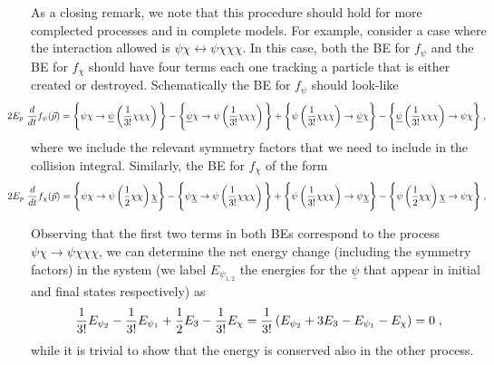 \documentclass[11pt,a4paper]{article}
\begin{document}
As a closing remark, we note that this procedure should hold for more complected processes and in complete models. For example, consider a case where the interaction allowed is $ \psi \chi \leftrightarrow \psi  \chi \chi \chi$. In this case, both the BE for $f_\psi$ and the BE for $f_\chi$ should have four terms each one tracking a   particle that is either created or destroyed. Schematically the BE for $f_\psi$ should look-like
%
$$\hspace{-0.9cm}
2E_p \ \dfrac{d}{dt} f_{\psi }(\vec{p}) = 
\lrBiggcb{\psi \chi \to \underline{\psi}  \lrb{\dfrac{1}{3!}\chi \chi \chi}} 
-\lrBiggcb{\underline{\psi} \chi \to \psi  \lrb{\dfrac{1}{3!}\chi \chi \chi}} 
+\lrBiggcb{ \psi \lrb{\dfrac{1}{3!}\chi \chi \chi} \to \underline{\psi}  \chi}
-\lrBiggcb{ \underline{\psi}  \lrb{\dfrac{1}{3!}\chi \chi \chi} \to \psi \chi} \;,
$$  
%
where we include the relevant symmetry factors that we need to include in the collision integral.
Similarly, the BE for $f_\chi$ of the form
%
$$\hspace{-0.9cm}
2E_p \ \dfrac{d}{dt} f_{\chi }(\vec{p}) = 
\lrBiggcb{\psi \chi \to \psi  \lrb{\dfrac{1}{2} \chi \chi} \underline{\chi} } 
-\lrBiggcb{\psi \underline{\chi}  \to \psi  \lrb{\dfrac{1}{3!}\chi \chi \chi}} 
+\lrBiggcb{ \psi  \lrb{\dfrac{1}{3!}\chi \chi \chi}  \to \psi \underline{\chi}}
-\lrBiggcb{ \psi \lrb{\dfrac{1}{2}\chi \chi}\underline{\chi} \to \psi  \chi}
 \;,
$$  
%

Observing that the first two terms in both BEs correspond to the process $\psi \chi \to \psi \chi \chi \chi $, we can determine the net energy change (including the symmetry factors) in the system (we label $E_{\psi_{1,2}}$ the energies for the  $\underline{\psi}$ that appear in initial and final states respectively) as
%
$$
\dfrac{1}{3!} E_{\psi_2} -  \dfrac{1}{3!} E_{\psi_1} + \dfrac{1}{2} E_3 - \dfrac{1}{3!} E_{\chi} =
\dfrac{1}{3!} \left(  E_{\psi_2} + 3 E_3 -  E_{\psi_1} -  E_{\chi} \right) =0 \;,
$$
%
while it is trivial to show that the energy is conserved also in the other process.



%                        
\end{document}
